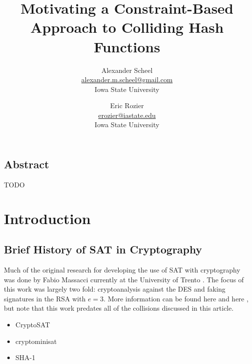 \documentclass[letterpaper,twocolumn,10pt]{article}
\begin{document}
\date{}

\title{\Large \bf Motivating a Constraint-Based Approach to Colliding Hash Functions }

\author{
{\rm Alexander Scheel}\\
\href{mailto:alexander.m.scheel@gmail.com}{alexander.m.scheel@gmail.com} \\
Iowa State University
\and
{\rm Eric Rozier}\\
\href{mailto:erozier@iastate.edu}{erozier@iastate.edu} \\
Iowa State University
}

\maketitle



\subsection*{Abstract}

TODO

\section{Introduction}
\subsection{Brief History of SAT in Cryptography}

Much of the original research for developing the use of SAT with cryptography
was done by Fabio Massacci currently at the University of Trento \cite{CryptoSAT}.
The focus of this work was largely two fold: cryptoanalysis against the DES
and faking signatures in the RSA with $e=3$. More information can be found
here \cite{MASSACCI2000LogicalCA} and here \cite{FIORINI2003101}, but note that
this work predates all of the collisions discussed in this article.


\begin{itemize}
    \item CryptoSAT
    \item cryptominisat
    \item SHA-1
\end{itemize}
\end{document}

